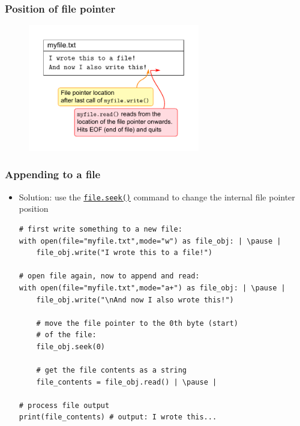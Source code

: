 \documentclass[xcolor=table]{beamer}
\begin{document}
\begin{frame}[fragile]
    \frametitle{Position of file pointer}
            \begin{figure}\centering%
                \vspace{1ex}%
                \includegraphics[width = 75mm]{file_pointer2.pdf}
            \end{figure}
\end{frame}


\begin{frame}[fragile]
    \frametitle{Appending to a file}
\begin{itemize}
    \item Solution: use the \href{https://docs.python.org/3/library/io.html#io.TextIOBase.seek}{\texttt{file.seek()}} command to change the internal file pointer position \pause 
\begin{lstlisting}[style=python]
# first write something to a new file:
with open(file="myfile.txt",mode="w") as file_obj: | \pause |
    file_obj.write("I wrote this to a file!")

# open file again, now to append and read:
with open(file="myfile.txt",mode="a+") as file_obj: | \pause |
    file_obj.write("\nAnd now I also wrote this!")

    # move the file pointer to the 0th byte (start)
    # of the file:
    file_obj.seek(0)

    # get the file contents as a string
    file_contents = file_obj.read() | \pause |

# process file output
print(file_contents) # output: I wrote this...
\end{lstlisting} \pause 
\end{itemize}
\end{frame}

\end{document}
